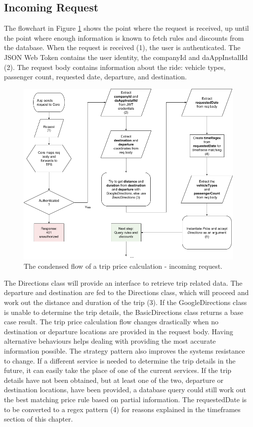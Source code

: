 \subsection{Incoming Request}
The flowchart in Figure \ref{fig:Incoming Request} shows the point where the request is received, up until the point where enough information is known to fetch rules and discounts from the database. When the request is received (1), the user is authenticated. The JSON Web Token contains the user identity, the companyId and daAppInstallId (2). The request body contains information about the ride: vehicle types, passenger count, requested date, departure, and destination.

\begin{figure}[H]
	\centering
	\includegraphics[width=1\textwidth]{IncomingRequest}
	\caption[Incoming Request]{The condensed flow of a trip price calculation - incoming request.}
	\label{fig:Incoming Request}
\end{figure}

The Directions class will provide an interface to retrieve trip related data. The departure and destination are fed to the Directions class, which will proceed and work out the distance and duration of the trip (3). If the GoogleDirections class is unable to determine the trip details, the BasicDirections class returns a base case result. The trip price calculation flow changes drastically when no destination or departure locations are provided in the request body. Having alternative behaviours helps dealing with providing the most accurate information possible. The strategy pattern also improves the systems resistance to change. If a different service is needed to determine the trip details in the future, it can easily take the place of one of the current services. If the trip details have not been obtained, but at least one of the two, departure or destination locations, have been provided, a database query could still work out the best matching price rule based on partial information. The requestedDate is to be converted to a regex pattern (4) for reasons explained in the timeframes section of this chapter.

